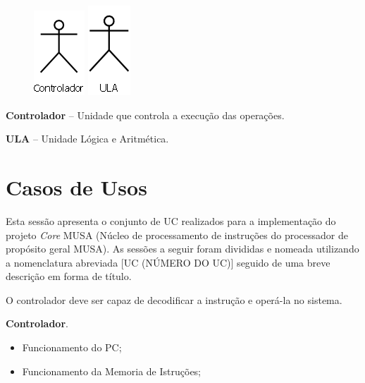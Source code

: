\documentclass{article}
\begin{document}
\begin{figure}[htb]
\centering
\begin{minipage}[c]{0.19\linewidth}
\centering
\includegraphics[scale=0.50]{./pictures/use/atores/controlador.png}
\end{minipage}
\begin{minipage}[c]{0.19\linewidth}
\centering
\includegraphics[scale=0.50]{./pictures/use/atores/ula.png}
\end{minipage}
\end{figure}

\textbf{Controlador} – Unidade que controla a execução das operações.

\textbf{ULA} – Unidade L\'{o}gica e Aritm\'{e}tica.
  
  \section{Casos de Usos}
  Esta sessão apresenta o conjunto de UC realizados para a implementação do projeto \textit{Core }MUSA (Núcleo de processamento de instruções do processador de propósito geral MUSA). As sessões a seguir foram divididas e nomeada utilizando a nomenclatura abreviada [UC (NÚMERO DO UC)] seguido de uma breve descrição em forma de título.

  O controlador deve ser capaz de decodificar a instrução e operá-la no sistema.
  
  \actors
    \begin{description}
     \item \textbf{Controlador}.
    \end{description}
    
  \preconditions 
    \begin{itemize}
     \item Funcionamento do PC;
     \item Funcionamento da Memoria de Istruções;
    \end{itemize}
\end{document}
